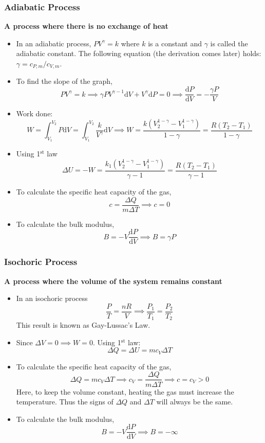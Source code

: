\documentclass{scrartcl}
\begin{document}
    \subsubsection{Adiabatic Process}
    \quad \textbf{A process where there is no exchange of heat}
    \begin{itemize}
        \item In an adiabatic process, $PV^\gamma=k$ where $k$ is a constant and $\gamma$ is called the adiabatic constant. The following equation (the derivation comes later) holds: $\gamma=c_{P,m}/c_{V,m}$.
        \item To find the slope of the graph, \[PV^\gamma=k\implies \gamma PV^{\gamma-1}\mathrm dV+V^\gamma\mathrm dP=0\implies\boxed{\frac{\mathrm dP}{\mathrm dV}=-\frac{\gamma P}V}\]
        \item Work done: \[W=\int_{V_1}^{V_2}P\mathrm dV=\int_{V_1}^{V_2}\frac k{V^\gamma}\mathrm dV\implies \boxed{W=\frac{k\left(V_2^{1-\gamma}-V_1^{1-\gamma}\right)}{1-\gamma}=\frac{R\left(T_2-T_1\right)}{1-\gamma}}\]
        \item Using 1$^\text{st}$ law \[\Delta U=-W=\frac{k_1\left(V_2^{1-\gamma}-V_1^{1-\gamma}\right)}{\gamma-1}=\frac{R\left(T_2-T_1\right)}{\gamma-1}\]
        \item To calculate the specific heat capacity of the gas, \[c=\frac{\Delta Q}{m\Delta T}\implies\boxed{c=0}\]
        \item To calculate the bulk modulus, \[B=-V\frac{\mathrm dP}{\mathrm dV}\implies\boxed{B=\gamma P}\]
    \end{itemize}
    \subsubsection{Isochoric Process}
    \quad \textbf{A process where the volume of the system remains constant}
    \begin{itemize}
        \item In an isochoric process \[\frac PT=\frac{nR}V\implies\frac{P_1}{T_1}=\frac{P_2}{T_2}\] This result is known as Gay-Lussac's Law.
        \item Since $\Delta V=0\implies W=0$. Using 1$^\text{st}$ law: \[\Delta Q=\Delta U=mc_V\Delta T\]
        \item To calculate the specific heat capacity of the gas, \[\Delta Q=mc_V\Delta T\implies c_V=\frac{\Delta Q}{m\Delta T}\implies\boxed{c=c_V>0}\] Here, to keep the volume constant, heating the gas must increase the temperature. Thus the signs of $\Delta Q$ and $\Delta T$ will always be the same.
        \item To calculate the bulk modulus, \[B=-V\frac{\mathrm dP}{\mathrm dV}\implies \boxed{B=-\infty}\]
    \end{itemize}
\end{document}
